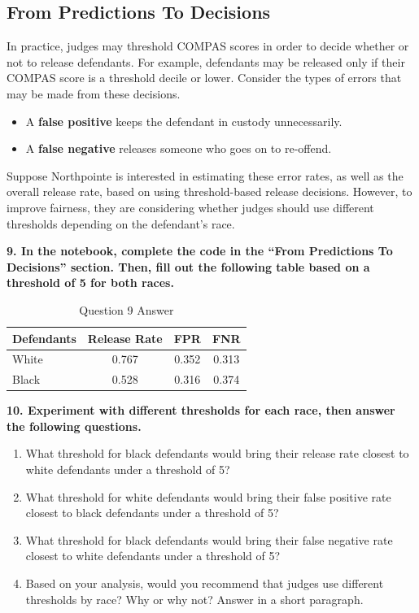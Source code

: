 \documentclass{article}
\begin{document}
\subsection*{From Predictions To Decisions}

In practice, judges may threshold COMPAS scores in order to decide whether or not to release defendants. For example, defendants may be released only if their COMPAS score is a threshold decile or lower. Consider the types of errors that may be made from these decisions. 
\begin{itemize}
    \item A \textbf{false positive} keeps the defendant in custody unnecessarily.
    \item A \textbf{false negative} releases someone who goes on to re-offend.
\end{itemize}

Suppose Northpointe is interested in estimating these error rates, as well as the overall release rate, based on using threshold-based release decisions. However, to improve fairness, they are considering whether judges should use different thresholds depending on the defendant's race.

\textbf{9. In the notebook, complete the code in the ``From Predictions To Decisions'' section. Then, fill out the following table based on a threshold of 5 for both races.}

\begin{table}[h]
    \centering
    \caption{Question 9 Answer}
    \begin{tabular}{l|ccc}
        \toprule
        \textbf{Defendants} & \textbf{Release Rate} & \textbf{FPR} & \textbf{FNR} \\
        \midrule
        White &0.767 & 0.352  & 0.313 \\
        Black & 0.528 & 0.316 & 0.374 \\
        \bottomrule
    \end{tabular}
    \label{tab:movie_ratings}
\end{table}

\textbf{10. Experiment with different thresholds for each race, then answer the following questions.}
\begin{enumerate}[label=\Alph*.]
    \item What threshold for black defendants would bring their release rate closest to white defendants under a threshold of 5?
    \item What threshold for white defendants would bring their false positive rate closest to black defendants under a threshold of 5?
    \item What threshold for black defendants would bring their false negative rate closest to white defendants under a threshold of 5?
    \item Based on your analysis, would you recommend that judges use different thresholds by race? Why or why not? Answer in a short paragraph.
\end{enumerate}
\end{document}
